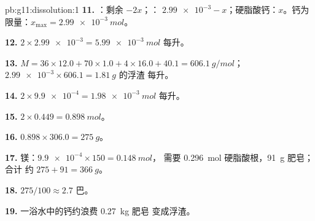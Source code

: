 \begin{solution}{pb:g11:dissolution:1}
\textbf{11.} ：剩余 $- 2x$；：
$\num{2.99e-3} - x$；硬脂酸钙：$x$。钙为
限量：$x_{\max} = \qty{2.99e-3}{mol}$。

\textbf{12.} $2 \times \num{2.99e-3} = \qty{5.99e-3}{mol}$ 每升。

\textbf{13.} $M = 36 \times 12.0 + 70 \times 1.0 + 4 \times 16.0 + 40.1 =
\qty{606.1}{g/mol}$；$\num{2.99e-3} \times 606.1 = \qty{1.81}{g}$ 的浮渣
每升。

\textbf{14.} $2 \times \num{9.9e-4} = \qty{1.98e-3}{mol}$ 每升。

\textbf{15.} $2 \times 0.449 = \qty{0.898}{mol}$。

\textbf{16.} $0.898 \times 306.0 = \qty{275}{g}$。

\textbf{17.} 镁：$\num{9.9e-4} \times 150 = \qty{0.148}{mol}$，
需要 \qty{0.296}{mol} 硬脂酸根，\qty{91}{g} 肥皂；合计
约 $275 + 91 = \qty{366}{g}$。

\textbf{18.} $275 / 100 \approx 2.7$ 巴。

\textbf{19.} 一浴水中的钙约浪费 \qty{0.27}{kg} 肥皂
变成浮渣。
\end{solution}
